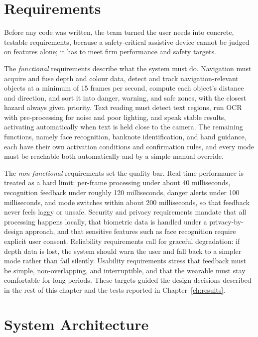 \section{Requirements}

Before any code was written, the team turned the user needs into concrete, testable requirements, because a safety-critical assistive device cannot be judged on features alone; it has to meet firm performance and safety targets.

The \emph{functional} requirements describe what the system must do. Navigation must acquire and fuse depth and colour data, detect and track navigation-relevant objects at a minimum of 15 frames per second, compute each object's distance and direction, and sort it into danger, warning, and safe zones, with the closest hazard always given priority. Text reading must detect text regions, run OCR with pre-processing for noise and poor lighting, and speak stable results, activating automatically when text is held close to the camera. The remaining functions, namely face recognition, banknote identification, and hand guidance, each have their own activation conditions and confirmation rules, and every mode must be reachable both automatically and by a simple manual override.

The \emph{non-functional} requirements set the quality bar. Real-time performance is treated as a hard limit: per-frame processing under about 40 milliseconds, recognition feedback under roughly 120 milliseconds, danger alerts under 100 milliseconds, and mode switches within about 200 milliseconds, so that feedback never feels laggy or unsafe. Security and privacy requirements mandate that all processing happens locally, that biometric data is handled under a privacy-by-design approach, and that sensitive features such as face recognition require explicit user consent. Reliability requirements call for graceful degradation: if depth data is lost, the system should warn the user and fall back to a simpler mode rather than fail silently. Usability requirements stress that feedback must be simple, non-overlapping, and interruptible, and that the wearable must stay comfortable for long periods. These targets guided the design decisions described in the rest of this chapter and the tests reported in Chapter~\ref{ch:results}.

\section{System Architecture}

